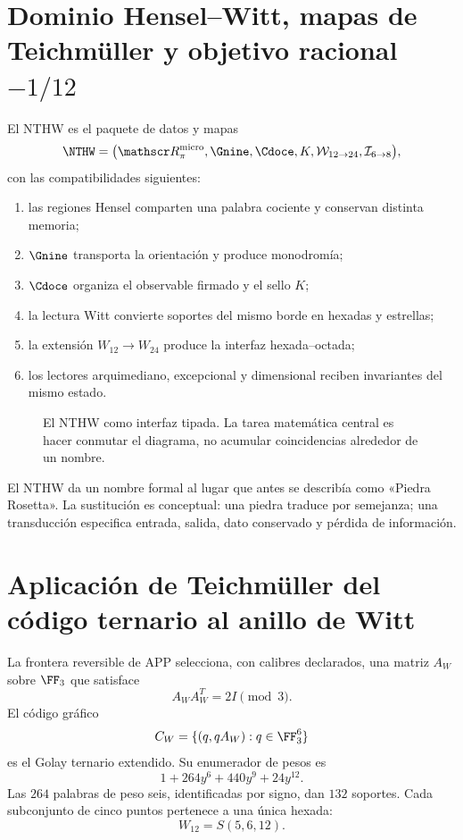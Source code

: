 \label{chap:p3-83-27-menos_un_doceavo}

\section{Dominio Hensel--Witt, mapas de Teichmüller y objetivo racional \(-1/12\)}

El NTHW es el paquete de datos y mapas
\[
\NTHW=
\bigl(
\mathscr R_\pi^{\rm micro},
\Gnine,
\Cdoce,
K,
\mathcal W_{12\to24},
\mathcal I_{6\to8}
\bigr),
\]
con las compatibilidades siguientes:
\begin{enumerate}
  \item las regiones Hensel comparten una palabra cociente y conservan
  distinta memoria;
  \item \(\Gnine\) transporta la orientación y produce monodromía;
  \item \(\Cdoce\) organiza el observable firmado y el sello \(K\);
  \item la lectura Witt convierte soportes del mismo borde en hexadas y
  estrellas;
  \item la extensión \(W_{12}\to W_{24}\) produce la interfaz
  hexada--octada;
  \item los lectores arquimediano, excepcional y dimensional reciben
  invariantes del mismo estado.
\end{enumerate}

\begin{figure}[!htbp]
\centering
\resizebox{\textwidth}{!}{}
\caption{El NTHW como interfaz tipada. La tarea matemática central es hacer
conmutar el diagrama, no acumular coincidencias alrededor de un nombre.}
\label{p3-83-c27-s1:fig:nthw}
\end{figure}

El NTHW da un nombre formal al lugar que antes se describía como «Piedra
Rosetta». La sustitución es conceptual: una piedra traduce por semejanza; una
transducción especifica entrada, salida, dato conservado y pérdida de
información.

\section{Aplicación de Teichmüller del código ternario al anillo de Witt}

La frontera reversible de APP selecciona, con calibres declarados, una matriz
\(A_W\) sobre \(\FF_3\) que satisface
\[
A_WA_W^T=2I\pmod3.
\]
El código gráfico
\[
C_W=\{(q,qA_W):q\in\FF_3^6\}
\]
es el Golay ternario extendido. Su enumerador de pesos es
\[
1+264y^6+440y^9+24y^{12}.
\]
Las \(264\) palabras de peso seis, identificadas por signo, dan \(132\)
soportes. Cada subconjunto de cinco puntos pertenece a una única hexada:
\[
W_{12}=S(5,6,12).
\]

